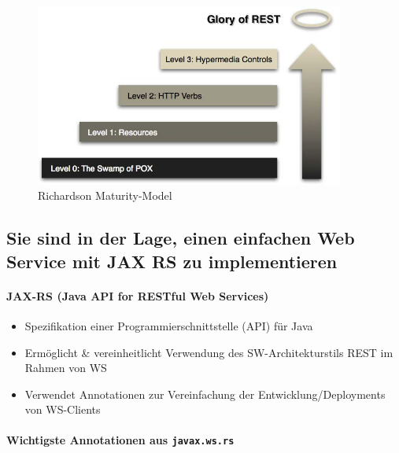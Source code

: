 \documentclass[a4paper]{article}
\begin{document}
			
			\begin{figure}[!htb]
				\centering
				\includegraphics[keepaspectratio, height=6cm]{img/ws/restful.jpg}
				\caption{Richardson Maturity-Model}
				\label{fig:restful}
			\end{figure}
		
		\newpage
		
		\subsection{Sie sind in der Lage, einen einfachen Web Service mit JAX RS zu implementieren}
		
			\paragraph{JAX-RS (Java API for RESTful Web Services)}
			
				\begin{itemize}
					\item Spezifikation einer Programmierschnittstelle (API) für Java
					\item Ermöglicht \& vereinheitlicht Verwendung des SW-Architekturstils REST im Rahmen von WS
					\item Verwendet Annotationen zur Vereinfachung der Entwicklung/Deployments von WS-Clients
				\end{itemize}
		
			\paragraph{Wichtigste Annotationen aus \texttt{javax.ws.rs}}
			
\end{document}
